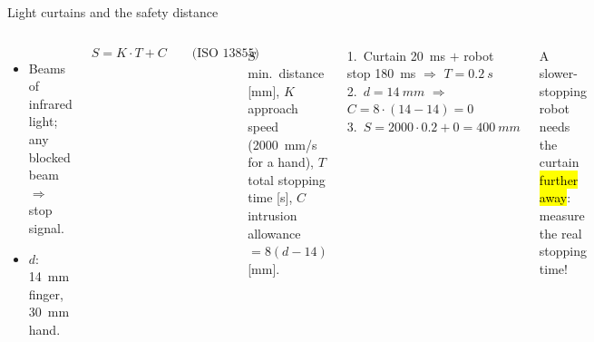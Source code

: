 \documentclass[aspectratio=169,10pt]{beamer}
\begin{document}
\begin{frame}{Light curtains and the safety distance}
\begin{columns}[T]
\centering
{}
\begin{itemize}\small
\item Beams of infrared light; any blocked beam $\Rightarrow$ stop signal.
\item {} $d$: \SI{14}{mm} finger, \SI{30}{mm} hand.
\end{itemize}
\begin{eqbox}
\vspace{-2mm}
\[ S=K\cdot T+C \qquad\text{(ISO 13855)} \]
\vspace{-4mm}
\end{eqbox}
{\footnotesize $S$ min.\ distance [mm], $K$ approach speed (\SI{2000}{mm/s} for a hand), $T$ total stopping time [s], $C$ intrusion allowance $=8(d-14)$ [mm].}
\begin{keybox}
\small
1.\ Curtain \SI{20}{ms} $+$ robot stop \SI{180}{ms} $\Rightarrow$ $T=\SI{0.2}{s}$\\
2.\ $d=\SI{14}{mm}$ $\Rightarrow$ $C=8\cdot(14-14)=0$\\
3.\ $S=2000\cdot0.2+0=\SI{400}{mm}$
\end{keybox}
\begin{notebox}
\small A slower-stopping robot needs the curtain \hl{further away}: measure the real stopping time!
\end{notebox}
\end{columns}
\end{frame}
\end{document}
